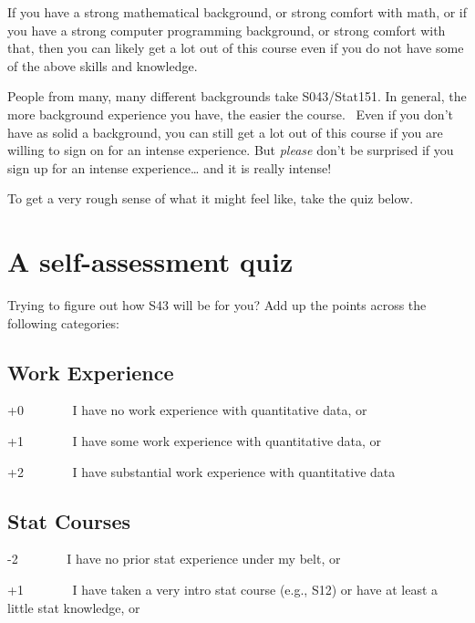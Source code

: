 \documentclass[
  letterpaper,
  DIV=11,
  numbers=noendperiod]{scrreprt}
\begin{document}
If you have a strong mathematical background, or strong comfort with
math, or if you have a strong computer programming background, or strong
comfort with that, then you can likely get a lot out of this course even
if you do not have some of the above skills and knowledge.

People from many, many different backgrounds take S043/Stat151. In
general, the more background experience you have, the easier the
course.~ Even if you don't have as solid a background, you can still get
a lot out of this course if you are willing to sign on for an intense
experience. But \emph{please} don't be surprised if you sign up for an
intense experience\ldots{} and it is really intense!

To get a very rough sense of what it might feel like, take the quiz
below.

\section*{A self-assessment quiz}\label{a-self-assessment-quiz}


Trying to figure out how S43 will be for you? \hspace{0pt}Add up the
points across the following categories:

\subsection*{\texorpdfstring{\textbf{Work
Experience}}{Work Experience}}\label{work-experience}

+0~~~~~~~ I have no work experience with quantitative data, or

+1~~~~~~~ I have some work experience with quantitative data, or

+2~~~~~~~ I have substantial work experience with quantitative data

\subsection*{\texorpdfstring{\textbf{Stat
Courses}}{Stat Courses}}\label{stat-courses}

-2~~~~~~~ I have no prior stat experience under my belt, or

+1~~~~~~~ I have taken a very intro stat course (e.g., S12) or have at
least a little stat knowledge, or
\end{document}
